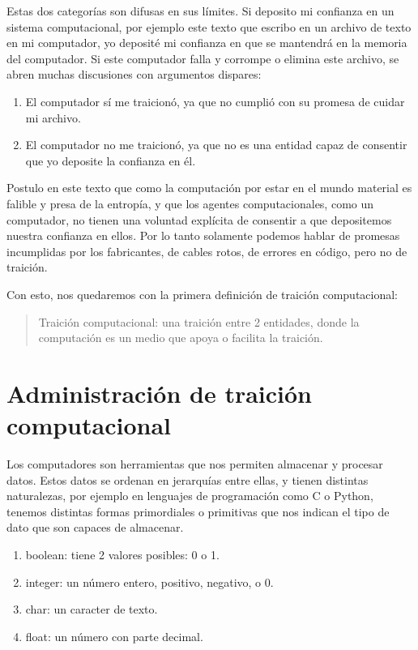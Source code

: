 \documentclass{article}
\begin{document}
Estas dos categorías son difusas en sus límites. Si deposito mi confianza en un sistema computacional, por ejemplo este texto que escribo en un archivo de texto en mi computador, yo deposité mi confianza en que se mantendrá en la memoria del computador. Si este computador falla y corrompe o elimina este archivo, se abren muchas discusiones con argumentos dispares:

\begin{enumerate}
    \item El computador sí me traicionó, ya que no cumplió con su promesa de cuidar mi archivo.
    \item El computador no me traicionó, ya que no es una entidad capaz de consentir que yo deposite la confianza en él.
\end{enumerate}

Postulo en este texto que como la computación por estar en el mundo material es falible y presa de la entropía, y que los agentes computacionales, como un computador, no tienen una voluntad explícita de consentir a que depositemos nuestra confianza en ellos. Por lo tanto solamente podemos hablar de promesas incumplidas por los fabricantes, de cables rotos, de errores en código, pero no de traición.

Con esto, nos quedaremos con la primera definición de traición computacional:

\begin{quote}
    Traición computacional: una traición entre 2 entidades, donde la computación es un medio que apoya o facilita la traición.
\end{quote}

\clearpage

\section{Administración de traición computacional}

Los computadores son herramientas que nos permiten almacenar y procesar datos. Estos datos se ordenan en jerarquías entre ellas, y tienen distintas naturalezas, por ejemplo en lenguajes de programación como C o Python, tenemos distintas formas primordiales o primitivas que nos indican el tipo de dato que son capaces de almacenar.

\begin{enumerate}
    \item boolean: tiene 2 valores posibles: 0 o 1.
    \item integer: un número entero, positivo, negativo, o 0.
    \item char: un caracter de texto.
    \item float: un número con parte decimal.
\end{enumerate}
\end{document}
